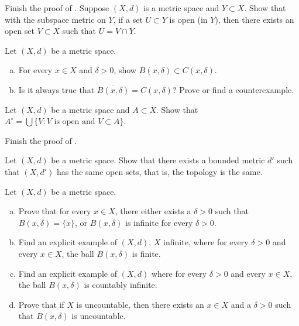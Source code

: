 \begin{exercise} \label{exercise:mssubspace}
Finish the proof of .
Suppose $(X,d)$ is a metric space and $Y \subset X$.  Show that
with the subspace metric on $Y$, if a set $U \subset Y$
is open (in $Y$), then there exists an open set $V \subset X$ such
that $U = V \cap Y$.
\end{exercise}

\begin{samepage}
\begin{exercise}
Let $(X,d)$ be a metric space.
\begin{enumerate}[a)]
\item
For every $x \in X$ and $\delta > 0$, show
$\overline{B(x,\delta)} \subset C(x,\delta)$.
\item
Is it always true that
$\overline{B(x,\delta)} = C(x,\delta)$?  Prove or find a counterexample.
\end{enumerate}
\end{exercise}
\end{samepage}

\begin{exercise} \label{exercise:interiortopologic}
Let $(X,d)$ be a metric space and $A \subset X$.  Show that
$A^\circ = \bigcup \{ V : V \text{ is open and } V \subset A \}$.
\end{exercise}

\begin{exercise}
Finish the proof of .
\end{exercise}

\begin{exercise}
Let $(X,d)$ be a metric space.  Show that there exists a bounded metric
$d'$ such that $(X,d')$ has the same open sets, that is, the topology is
the same.
\end{exercise}

\begin{samepage}
\begin{exercise}
Let $(X,d)$ be a metric space.
\begin{enumerate}[a)]
\item
Prove that for every $x \in X$, there either exists a $\delta > 0$ such that
$B(x,\delta) = \{ x \}$, or $B(x,\delta)$ is infinite for every $\delta >  0$.
\item
Find an explicit example of $(X,d)$, $X$ infinite, where
for every $\delta > 0$ and
every $x \in X$, the
ball $B(x,\delta)$ is finite.
\item
Find an explicit example of $(X,d)$ where for every $\delta > 0$ and
every $x \in X$, the
ball $B(x,\delta)$ is countably infinite.
\item
Prove that if $X$ is uncountable, then there exists
an $x \in X$ and a $\delta > 0$ such that $B(x,\delta)$ is uncountable.
\end{enumerate}
\end{exercise}
\end{samepage}

